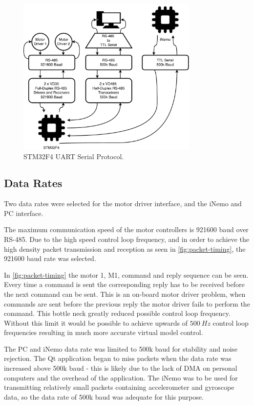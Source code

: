 \begin{figure}
\centering
\includegraphics[width=0.8\textwidth]{images/comms/uart-communication.pdf} 
\caption{STM32F4 UART Serial Protocol.}
\label{fig:uart-communication}
\end{figure}

\subsection{Data Rates}

Two data rates were selected for the motor driver interface, and the iNemo and PC interface. 

The maximum communication speed of the motor controllers is 921600 baud over RS-485. Due to the high speed control loop frequency, and in order to achieve the high density packet transmission and reception as seen in \cref{fig:packet-timing}, the 921600 baud rate was selected.

In \cref{fig:packet-timing} the motor 1, M1, command and reply sequence can be seen. Every time a command is sent the corresponding reply has to be received before the next command can be sent. This is an on-board motor driver problem, when commands are sent before the previous reply the motor driver fails to perform the command. This bottle neck greatly reduced possible control loop frequency. Without this limit it would be possible to achieve upwards of $500\ Hz$ control loop frequencies resulting in much more accurate virtual model control.

The PC and iNemo data rate was limited to 500k baud for stability and noise rejection. The Qt application began to miss packets when the data rate was increased above 500k baud - this is likely due to the lack of DMA on personal computers and the overhead of the application. The iNemo was to be used for transmitting relatively small packets containing accelerometer and gyroscope data, so the data rate of 500k baud was adequate for this purpose.

